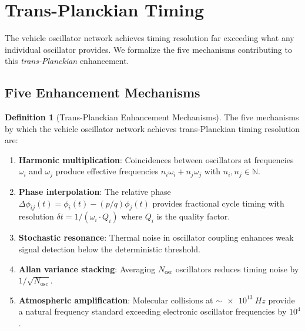 \documentclass[twocolumn,10pt]{article}
\theoremstyle{definition}
\newtheorem{definition}[theorem]{Definition}
\theoremstyle{remark}
\newcommand{\N}{\mathbb{N}}
\begin{document}
\section{Trans-Planckian Timing}\label{sec:transplanckian}

The vehicle oscillator network achieves timing resolution far exceeding what
any individual oscillator provides. We formalize the five mechanisms
contributing to this \emph{trans-Planckian} enhancement.

\subsection{Five Enhancement Mechanisms}

\begin{definition}[Trans-Planckian Enhancement Mechanisms]\label{def:five-mechanisms}
The five mechanisms by which the vehicle oscillator network achieves
trans-Planckian timing resolution are:
\begin{enumerate}[label=(\Roman*)]
  \item \textbf{Harmonic multiplication}: Coincidences between oscillators
    at frequencies $\omega_i$ and $\omega_j$ produce effective frequencies
    $n_i \omega_i + n_j \omega_j$ with $n_i, n_j \in \N$.
  \item \textbf{Phase interpolation}: The relative phase
    $\Delta\phi_{ij}(t) = \phi_i(t) - (p/q)\phi_j(t)$ provides fractional
    cycle timing with resolution $\delta t = 1/(\omega_i \cdot Q_i)$ where
    $Q_i$ is the quality factor.
  \item \textbf{Stochastic resonance}: Thermal noise in oscillator
    coupling enhances weak signal detection below the deterministic
    threshold.
  \item \textbf{Allan variance stacking}: Averaging $N_{\mathrm{osc}}$
    oscillators reduces timing noise by $1/\sqrt{N_{\mathrm{osc}}}$.
  \item \textbf{Atmospheric amplification}: Molecular collisions at
    $\sim\!\SI{e13}{Hz}$ provide a natural frequency standard exceeding
    electronic oscillator frequencies by $10^4$.
\end{enumerate}
\end{definition}
\end{document}
